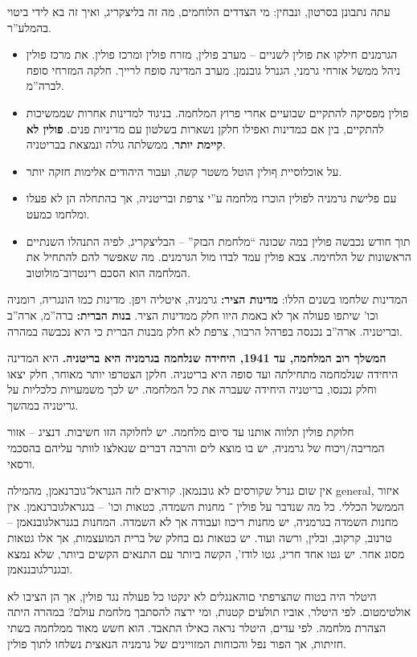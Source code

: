 \documentclass[]{article}
\begin{document}
   עתה נתבונן בסרטון, ונבחין: מי הצדדים הלוחמים, מה זה בליצקריג, ואיך זה בא לידי ביטוי בהמלע''ר. 
   \begin{itemize}
       \item הגרמנים חילקו את פולין לשניים – מערב פולין, מזרח פולין ומרכז פולין. את מרכז פולין ניהל ממשל אזרחי גרמני, הגנרל גובנמן. מערב המדינה סופח לרייך. חלקה המזרחי סופח לברה''מ. 
       \item פולין מפסיקה להתקיים שבועיים אחרי פרוץ המלחמה. בניגוד למדינות אחרות שממשיכות להתקיים, בין אם כמדינות ואפילו חלקן נשארות בשלטון עם מדיניות פנים. \textbf{פולין לא קיימת יותר}. ממשלתה גולה ונמצאת בבריטניה. 
       \item על אוכלוסיית ףולין הוטל משטר קשה, ועבור היהודים אלימות חזקה יותר. 
       \item עם פלישת גרמניה לפולין הוכרז מלחמה ע''י צרפת ובריטניה, אך בהתחלה הן לא פעלו ומלחמו כמעט. 
       \item תוך חודש נכבשה פולין במה שכונה ``מלחמת הבזק'' – הבליצקריג, לפיה התנהלו השנתיים הראשונות של הלחימה. צבא פולין עמד לבדו מול הגרמנים. מה שאפשר להם להתחיל את המלחמה הוא הסכם רינטרוב־מולוטוב. 
   \end{itemize}
   המדינות שלחמו בשנים הללו: \textbf{מדינות הציר: }גרמניה, איטליה ויפן. מדינות כמו הונגריה, רומניה וכו' שיתפו פעולה אך לא באמת היוו חלק ממדינות הציר. \textbf{בנות הברית: }ברה''מ, ארה''ב ובריטניה. ארה''ב נכנסה בפרהל הרבור, צרפת לא חלק מבנות הברית כי היא נכבשה במהרה. 
   
   \textbf{המשלך רוב המלחמה, עד 1941, היחידה שנלחמה בגרמניה היא בריטניה. }היא המדינה היחידה שנלמחמה מתחילתה ועד סופה היא בריטניה. חלקן הצטרפו יותר מאוחר, חלק יצאו וחלק נכנסו, בריטניה היחידה שעברה את כל המלחמה. יש לכך משמעויות כלכליות על גריטניה במהשך. 
   
   חלוקת פולין תלווה אותנו עד סיום מלחמה. יש לחלוקה הזו חשיבות. דנציג – אזור המריבה/ויכוח של גרמניה, יש בו מוצא לים והרבה דברים שנאלצו לוותר עליהם בהסכמי ורסאי. 
   
   אין שום גנרל שקורסים לא גובנמאן. קוראים לזה הגנראל־גוברנאמן, מהמילה general, איזור הממשל הכללי. כל מה שנדבר על פולין ־ מחנות השמדה, כטאות וכו' – בגנראלגוברנאמן. אין מחנות השמדה בגרמניה, יש מחנות ריכוז ועבודה אך לא השמדה. המחנות בגנראלגובנאמן  –טרנוב, קרקוב, ובלין, ורשה ועוד. יש כטאות גם בחלק של ברית המועצמות, אך אלו גטאות מסוג אחר. יש גטו אחד חריג, גטו לודז', הקשה ביותר עם התנאים הקשים ביותר, שלא נמצא ובגנרלגובננאמן. 
   
   היטלר היה בטוח שהצרפתי םוהאנגלים לא ינקטו כל פעולה נגד פולין, אך הן הציבו לא אולטימטום. לפי היטלר, אוביו תולעים קטנות, ומי ירצה להסתבך מלחמת עולם? במהרה היתה הצהרת מלחמה. לפי עדים, היטלר נראה כאילו התאבד. הוא חשש מאוד ממלחמה בשתי חזיתות, אך הפור נפל והכוחות המזויינים של גרמניה הנאצית נשלחו לתוך פולין. 
   
\end{document}
